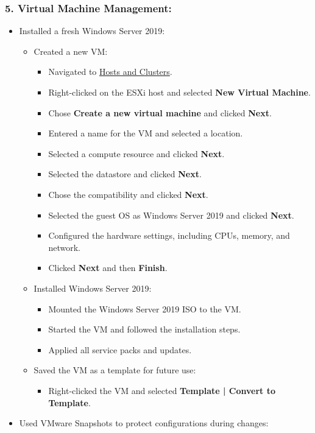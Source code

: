 \documentclass[letterpaper]{article}
\begin{document}
\subsubsection{5. Virtual Machine Management:}
\label{sec:orgb94b91d}
\begin{itemize}
\item Installed a fresh Windows Server 2019:
\begin{itemize}
\item Created a new VM:
\begin{itemize}
\item Navigated to \uline{Hosts and Clusters}.
\item Right-clicked on the ESXi host and selected \textbf{New Virtual Machine}.
\item Chose \textbf{Create a new virtual machine} and clicked \textbf{Next}.
\item Entered a name for the VM and selected a location.
\item Selected a compute resource and clicked \textbf{Next}.
\item Selected the datastore and clicked \textbf{Next}.
\item Chose the compatibility and clicked \textbf{Next}.
\item Selected the guest OS as Windows Server 2019 and clicked \textbf{Next}.
\item Configured the hardware settings, including CPUs, memory, and network.
\item Clicked \textbf{Next} and then \textbf{Finish}.
\end{itemize}
\item Installed Windows Server 2019:
\begin{itemize}
\item Mounted the Windows Server 2019 ISO to the VM.
\item Started the VM and followed the installation steps.
\item Applied all service packs and updates.
\end{itemize}
\item Saved the VM as a template for future use:
\begin{itemize}
\item Right-clicked the VM and selected \textbf{Template | Convert to Template}.
\end{itemize}
\end{itemize}
\item Used VMware Snapshots to protect configurations during changes:
\begin{itemize}

\end{itemize}
\end{itemize}
\end{document}
